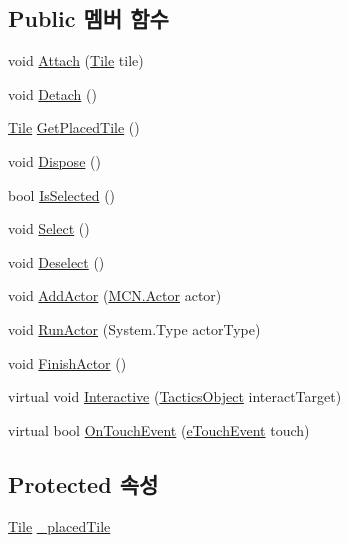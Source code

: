 \subsection*{Public 멤버 함수}
\begin{DoxyCompactItemize}
\item 
void \hyperlink{class_placeable_object_a3176ec3d5d26b2a83cdc58b01e630aa1}{Attach} (\hyperlink{class_tile}{Tile} tile)
\item 
void \hyperlink{class_placeable_object_aef2018b58bf7c8c0fab5aaf3d9a154d4}{Detach} ()
\item 
\hyperlink{class_tile}{Tile} \hyperlink{class_placeable_object_ab44a9b122632ac3cf0babb5040e8a201}{Get\+Placed\+Tile} ()
\item 
void \hyperlink{class_placeable_object_a8bd49b7db556556502a0518fc833be48}{Dispose} ()
\item 
bool \hyperlink{class_placeable_object_a71fd42914caa0dc6229fe6a5ffe09b99}{Is\+Selected} ()
\item 
void \hyperlink{class_placeable_object_a019818f3f6c6eb715fed163efa921f5a}{Select} ()
\item 
void \hyperlink{class_placeable_object_a0c1248b1f9981ddbf68e6f70a6498f3d}{Deselect} ()
\item 
void \hyperlink{class_tactics_object_a2c2b15e6cdb3639a2273978e9b9f294f}{Add\+Actor} (\hyperlink{class_m_c_n_1_1_actor}{M\+C\+N.\+Actor} actor)
\item 
void \hyperlink{class_tactics_object_ac24894e1e9355ac7bb7c94b7ea51ef02}{Run\+Actor} (System.\+Type actor\+Type)
\item 
void \hyperlink{class_tactics_object_a4e08c233c75e0f0025f13f92b4e3ec1a}{Finish\+Actor} ()
\item 
virtual void \hyperlink{class_tactics_object_a5f94ed01497a7072a2785163f4cbc57b}{Interactive} (\hyperlink{class_tactics_object}{Tactics\+Object} interact\+Target)
\item 
virtual bool \hyperlink{class_tactics_object_af34052e62ea471d21e4c601cc79ff717}{On\+Touch\+Event} (\hyperlink{_touch_manager_8cs_ae33e321a424fe84ba8b2fdb81ad40a68}{e\+Touch\+Event} touch)
\end{DoxyCompactItemize}
\subsection*{Protected 속성}
\begin{DoxyCompactItemize}
\item 
\hyperlink{class_tile}{Tile} \hyperlink{class_placeable_object_a0fd0566f0bb15c71b0630322762342d8}{\+\_\+placed\+Tile}
\end{DoxyCompactItemize}
